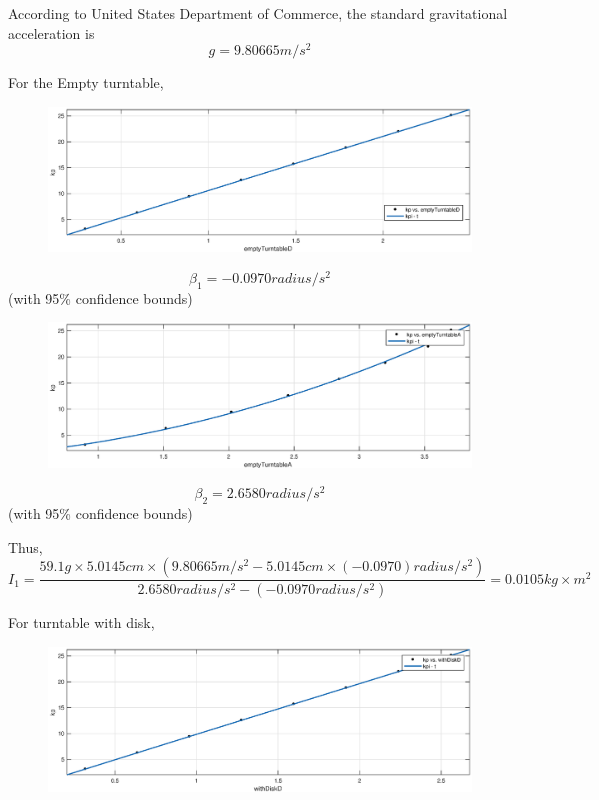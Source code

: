 According to  United States Department of Commerce, the standard gravitational
acceleration is 
$$ g =  9.80665 m/s^2 $$

For the Empty turntable,
\newcommand{\EFWwr}{17cm}
\begin{figure}[H]
\centering
\includegraphics[width=\EFWwr]{matlab/etd}
\end{figure}

$$ \beta_1 = -0.0970 radius/s^2$$ (with 95\% confidence bounds) 

\begin{figure}[H]
\centering
\includegraphics[width=\EFWwr]{matlab/eta}
\end{figure}

$$ \beta_2 = 2.6580 radius/s^2$$ (with 95\% confidence bounds) 

Thus,
$$ I_1 = \frac{59.1 g \times 5.0145 cm \times (9.80665 m/s^2 - 5.0145 cm \times (-0.0970) radius/s^2 )}{2.6580 radius/s^2 -(-0.0970 radius/s^2) } = 0.0105 kg\times m^2 $$

For turntable with disk,
\begin{figure}[H]
\centering
\includegraphics[width=\EFWwr]{matlab/wdd}
\end{figure}

